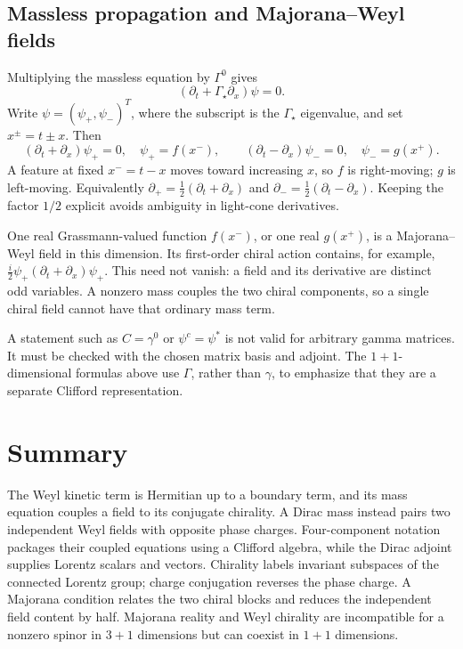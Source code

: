 \documentclass[11pt]{article}
\begin{document}
\subsection{Massless propagation and Majorana--Weyl fields}
Multiplying the massless equation by \(\Gamma^0\) gives
\begin{equation}
 (\partial_t+\Gamma_\star\partial_x)\psi=0.
 \label{eq:2dweyl}
\end{equation}
Write \(\psi=(\psi_+,\psi_-)^T\), where the subscript is the
\(\Gamma_\star\) eigenvalue, and set \(x^\pm=t\pm x\). Then
\begin{equation}
 (\partial_t+\partial_x)\psi_+=0,\quad \psi_+=f(x^-),
 \qquad
 (\partial_t-\partial_x)\psi_-=0,\quad \psi_-=g(x^+).
 \label{eq:2dwaves}
\end{equation}
A feature at fixed \(x^-=t-x\) moves toward increasing \(x\),
so \(f\) is right-moving; \(g\) is left-moving. Equivalently
\(\partial_+=\tfrac12(\partial_t+\partial_x)\) and
\(\partial_-=\tfrac12(\partial_t-\partial_x)\). Keeping the factor
\(1/2\) explicit avoids ambiguity in light-cone derivatives.

One real Grassmann-valued function \(f(x^-)\), or one real
\(g(x^+)\), is a Majorana--Weyl field in this dimension. Its
first-order chiral action contains, for example,
\(\tfrac{i}{2}\psi_+(\partial_t+\partial_x)\psi_+\).
This need not vanish: a field and its derivative are distinct odd
variables. A nonzero mass couples the two chiral components, so a
single chiral field cannot have that ordinary mass term.

\begin{remarkbox}
A statement such as \(C=\gamma^0\) or \(\psi^c=\psi^*\) is not
valid for arbitrary gamma matrices. It must be checked with the chosen
matrix basis and adjoint. The \(1+1\)-dimensional formulas above use
\(\Gamma\), rather than \(\gamma\), to emphasize that they are a
separate Clifford representation.
\end{remarkbox}

\section*{Summary}
The Weyl kinetic term is Hermitian up to a boundary term, and its
mass equation couples a field to its conjugate chirality.
A Dirac mass instead pairs two independent Weyl fields with opposite
phase charges. Four-component notation packages their coupled equations
using a Clifford algebra, while the Dirac adjoint supplies Lorentz
scalars and vectors. Chirality labels invariant subspaces of the
connected Lorentz group; charge conjugation reverses the phase charge.
A Majorana condition relates the two chiral blocks and reduces the
independent field content by half. Majorana reality and Weyl chirality
are incompatible for a nonzero spinor in \(3+1\) dimensions but can
coexist in \(1+1\) dimensions.
\end{document}
